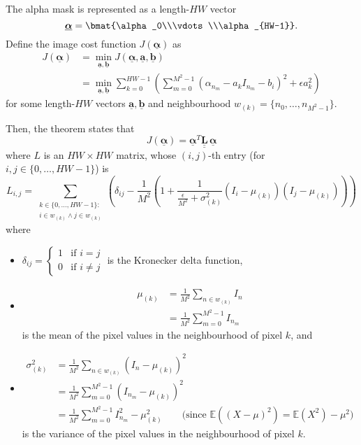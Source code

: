 \documentclass{article}
\def\vt#1{\underline{\mathbf{#1}}}
\def\vts#1{\underline{\boldsymbol{#1}}}
\def\mt#1{\underline{\underline{\mathbf{#1}}}}
\begin{document}
The alpha mask is represented as a length-$HW$ vector
$$\vts\alpha = \bmat{\alpha_0\\\vdots\\\alpha_{HW-1}}.$$
Define the image cost function $J(\vts\alpha)$ as
\begin{align*}
    J(\vts\alpha) &= \min_{\vt a,\vt b} J(\vts\alpha, \vt a, \vt b)\\
    &= \min_{\vt a,\vt b} \sum_{k=0}^{HW-1} \left(\sum_{m=0}^{M^2-1} \left(\alpha_{n_m} - a_kI_{n_m} - b_i\right)^2 + \epsilon a_k^2 \right)%
\end{align*}
for some length-$HW$ vectors $\vt a, \vt b$ and neighbourhood $w_{(k)}=\{n_0,\dots,n_{M^2-1}\}$.

Then, the theorem states that
$$J(\vts \alpha) = \vts \alpha^T \mt L\, \vts \alpha$$
where $L$ is an $HW\times HW$ matrix, whose $(i,j)$-th entry (for $i,j\in\{0,\dots,HW-1\}$) is
$$L_{i,j} = \sum_{\substack{k\in\{0,\dots,HW-1\}:\\i\in w_{(k)}\wedge j\in w_{(k)}}} \left( \delta_{ij} - \frac1{M^2}\left(1 + \frac1{\frac\epsilon{M^2} + \sigma_{(k)}^2} \left({I}_i - \mu_{(k)}\right) \left({I}_j - \mu_{(k)}\right) \right) \right)$$
where
\begin{itemize}
    \item $\delta_{ij} = \begin{cases}
        1&\text{if $i=j$}\\
        0&\text{if $i\neq j$}
    \end{cases}$ is the Kronecker delta function,
    \item \begin{align*}
        \mu_{(k)} &= \frac1{M^2} \sum_{n\in w_{(k)}} I_{n} \\&= \frac1{M^2} \sum_{m=0}^{M^2-1} I_{n_m}
    \end{align*} is the mean of the pixel values in the neighbourhood of pixel $k$, and
    \item \begin{align*}
        \sigma^2_{(k)} &= \frac1{M^2} \sum_{n\in w_{(k)}} \left(I_n- \mu_{(k)}\right)^2 \\
        &=  \frac1{M^2} \sum_{m=0}^{M^2-1} \left(I_{n_m}- \mu_{(k)}\right)^2 \\
        &=  \frac1{M^2} \sum_{m=0}^{M^2-1} I_{n_m}^2 - \mu_{(k)}^2 \qquad \text{(since $\mathbb{E}\left((X-\mu)^2\right) = \mathbb{E}\left(X^2\right) - \mu^2$)}
    \end{align*} is the variance of the pixel values in the neighbourhood of pixel $k$.
\end{itemize}
\end{document}
